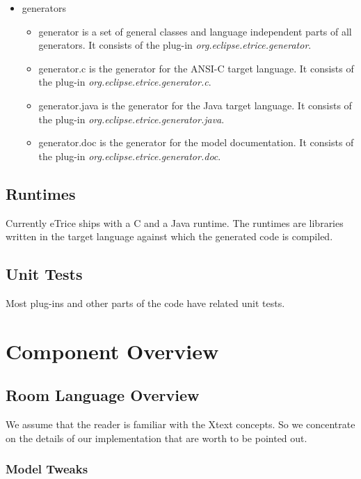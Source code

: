\begin{itemize}
\item generators
\begin{itemize}
\item generator is a set of general classes and language independent parts of all generators. It consists 
of the plug-in \textit{org.eclipse.etrice.generator}.
\item generator.c is the generator for the ANSI-C target language. It consists of the plug-in 
\textit{org.eclipse.etrice.generator.c}.
\item generator.java is the generator for the Java target language. It consists of the plug-in 
\textit{org.eclipse.etrice.generator.java}.
\item generator.doc is the generator for the model documentation. It consists of the plug-in 
\textit{org.eclipse.etrice.generator.doc}.
\end{itemize}
\end{itemize}

\subsection{Runtimes}

Currently eTrice ships with a C and a Java runtime. The runtimes are libraries written in the target 
language against which the generated code is compiled.

\subsection{Unit Tests}

Most plug-ins and other parts of the code have related unit tests.

\section{Component Overview}

\subsection{Room Language Overview}

We assume that the reader is familiar with the Xtext concepts. So we concentrate on the details of our 
implementation that are worth to be pointed out.

\subsubsection{Model Tweaks}

